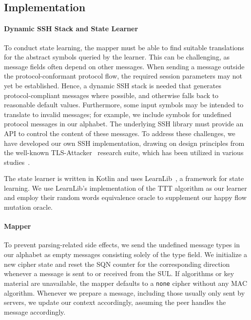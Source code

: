 \subsection{Implementation}

\paragraph{Dynamic SSH Stack and State Learner}

To conduct state learning, the mapper must be able to find suitable translations for the abstract symbols queried by the learner. This can be challenging, as message fields often depend on other messages. When sending a message outside the protocol-conformant protocol flow, the required session parameters may not yet be established. Hence, a dynamic SSH stack is needed that generates protocol-compliant messages where possible, and otherwise falls back to reasonable default values. Furthermore, some input symbols may be intended to translate to invalid messages; for example, we include symbols for undefined protocol messages in our alphabet. The underlying SSH library must provide an API to control the content of these messages. To address these challenges, we have developed our own SSH implementation, drawing on design principles from the well-known TLS-Attacker~\cite{CCS:Somorovsky16} research suite, which has been utilized in various studies~\cite[Table 1]{2024TLSAttacker}.

The state learner is written in Kotlin and uses LearnLib~\cite{isberner2015open}, a framework for state learning. We use LearnLib's implementation of the TTT algorithm as our learner and employ their random words equivalence oracle to supplement our happy flow mutation oracle.

\paragraph{Mapper} 

To prevent parsing-related side effects, we send the undefined message types in our alphabet as empty messages consisting solely of the type field. We initialize a new cipher state and reset the SQN counter for the corresponding direction whenever a \msgnewkeys message is sent to or received from the SUL. If algorithms or key material are unavailable, the mapper defaults to a \texttt{none} cipher without any MAC algorithm. Whenever we prepare a message, including those usually only sent by servers, we update our context accordingly, assuming the peer handles the message accordingly.

